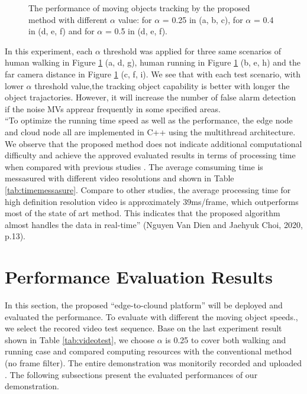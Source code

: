 \begin{figure}
{}
\caption{The performance of moving objects tracking by the proposed method with different $\alpha$ value: for $\alpha$ = 0.25 in (a, b, c), for $\alpha$ = 0.4 in (d, e, f) and for $\alpha$ = 0.5 in (d, e, f).}
\label{fig:objecttracking}
\end{figure}
In this experiment, each $\alpha$ threshold was applied for three same scenarios of human walking in Figure \ref{fig:objecttracking} (a, d, g), human running in Figure \ref{fig:objecttracking} (b, e, h) and the far camera distance in Figure \ref{fig:objecttracking} (c, f, i).  We see that with each test scenario, with lower $\alpha$ threshold value,the tracking object capability is better with longer the object trajactories. However, it will increase the number of false alarm detection if the noise MVs apprear frequently in some specified areas.\\ “To optimize the running time speed as well as the performance, the edge node and cloud node all are implemented in C++ using the multithread architecture. We observe that the proposed method does not indicate additional computational difficulty and achieve the approved evaluated results in terms of processing time when compared with previous studies \cite{bombardelli2018efficient} \cite{khatoonabadi2012video}. The average comsuming time  is messasured with different video resolutions and shown in Table \ref{tab:timemessasure}. Compare to other studies, the average processing time for high definition resolution video is approximately 39ms/frame, which outperforms most of the state of art method. This indicates that the proposed algorithm almost handles the data in real-time” (Nguyen Van Dien and Jaehyuk Choi, 2020, p.13). 

\section{Performance Evaluation Results}
 In this section, the proposed “edge-to-clound platform” will be deployed and  evaluated the performance. To evaluate with different the moving object speeds., we select the recored video test sequence. Base on the last experiment result shown in Table \ref{tab:videotest}, we choose  $\alpha$ is 0.25 to cover both walking and running case and compared computing resources with the conventional method (no frame filter). The entire demonstration was monitorily recorded and uploaded \cite{source}. The following subsections present the evaluated performances of our demonstration.
 
